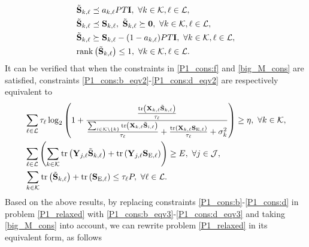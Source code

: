 \documentclass[12pt,draftclsnofoot, onecolumn]{IEEEtran}
\theoremstyle{plain}
\begin{document}
\begin{sloppypar}
\begin{subequations}\label{big_M_cons}
	\begin{align}
	& \tilde{\mathbf S}_{k,\ell} \preceq a_{k,\ell}PT\mathbf I, \ \forall k\in\mathcal K, \ell \in\mathcal L, \label{big_M_cons:a}\\
	& \tilde{\mathbf S}_{k,\ell} \preceq \mathbf S_{k,\ell}, \ \tilde{\mathbf S}_{k,\ell} \succeq \mathbf 0, \ \forall k\in\mathcal K, \ell \in\mathcal L, \label{big_M_cons:b}\\
	& \tilde{\mathbf S}_{k,\ell} \succeq \mathbf S_{k,\ell} - (1 - a_{k,\ell})PT\mathbf I, \ \forall k\in\mathcal K, \ell \in\mathcal L, \label{big_M_cons:c}\\
	& {\rm rank}\left(\tilde{\mathbf S}_{k,\ell}\right) \leq 1, \ \forall k\in\mathcal K, \ell \in\mathcal L. \label{big_M_cons:d}
	\end{align}
\end{subequations}
It can be verified that when the constraints in \eqref{P1_cons:f} and \eqref{big_M_cons} are satisfied, constraints \eqref{P1_cons:b_eqv2}-\eqref{P1_cons:d_eqv2} are respectively equivalent to
\begin{align}
& \sum_{\ell\in\mathcal L}\tau_\ell\log_2\left(1 + \frac{\frac{{\rm tr}\left(\mathbf X_{k,\ell}\tilde{\mathbf S}_{k,\ell}\right)}{\tau_\ell}}{\frac{\sum_{i\in \mathcal K\backslash\{k\}}{\rm tr}\left(\mathbf X_{k,\ell}\tilde{\mathbf S}_{i,\ell}\right)}{\tau_\ell} + \frac{{\rm tr}\left(\mathbf X_{k,\ell}\mathbf S_{\mathrm E,\ell}\right)}{\tau_\ell} + \sigma_k^2} \right) \geq \eta, \ \forall k\in\mathcal K, \label{P1_cons:b_eqv3}\\ 
& \sum_{\ell\in\mathcal L}\left(\sum_{k\in\mathcal K}{\rm tr}\left(\mathbf Y_{j,\ell}\tilde{\mathbf S}_{k,\ell}\right) + {\rm tr}\left(\mathbf Y_{j,\ell}\mathbf S_{\mathrm E, \ell} \right) \right) \geq E, \ \forall j\in\mathcal J, \label{P1_cons:c_eqv3}\\
& \sum_{k\in\mathcal K}{\rm tr}\left(\tilde{\mathbf S}_{k,\ell}\right)  + {\rm tr}\left(\mathbf S_{\mathrm E,\ell} \right) \leq \tau_\ell P, \ \forall \ell\in\mathcal L. \label{P1_cons:d_eqv3}
\end{align}
Based on the above results, by replacing constraints \eqref{P1_cons:b}-\eqref{P1_cons:d} in problem \eqref{P1_relaxed} with \eqref{P1_cons:b_eqv3}-\eqref{P1_cons:d_eqv3} and taking \eqref{big_M_cons} into account, we can rewrite problem \eqref{P1_relaxed} in its equivalent form, as follows  
\begin{align}\label{P1_relaxed_eqv}

\end{align}
\end{sloppypar}
\end{document}
